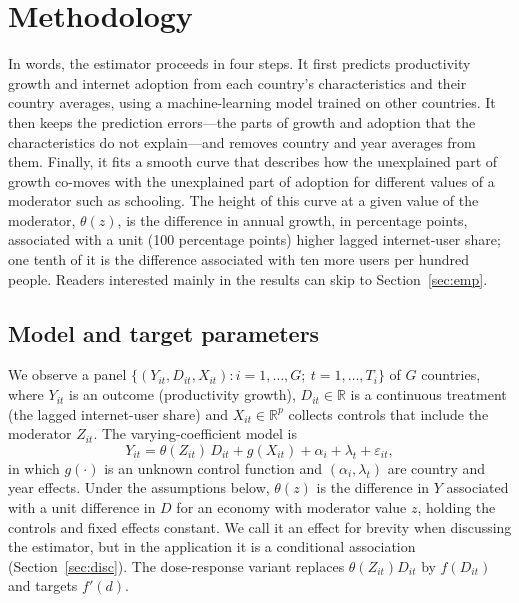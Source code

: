 \documentclass[pdflatex,sn-basic]{sn-jnl}%
\theoremstyle{thmstyleone}
\theoremstyle{thmstyletwo}
\begin{document}
\section{Methodology}\label{sec:method}

In words, the estimator proceeds in four steps. It first predicts productivity growth and internet adoption from each country's characteristics and their country averages, using a machine-learning model trained on other countries. It then keeps the prediction errors---the parts of growth and adoption that the characteristics do not explain---and removes country and year averages from them. Finally, it fits a smooth curve that describes how the unexplained part of growth co-moves with the unexplained part of adoption for different values of a moderator such as schooling. The height of this curve at a given value of the moderator, $\theta(z)$, is the difference in annual growth, in percentage points, associated with a unit (100 percentage points) higher lagged internet-user share; one tenth of it is the difference associated with ten more users per hundred people. Readers interested mainly in the results can skip to Section~\ref{sec:emp}.

\subsection{Model and target parameters}

We observe a panel $\{(Y_{it},D_{it},X_{it}) : i=1,\dots,G;\ t=1,\dots,T_i\}$ of $G$ countries, where $Y_{it}$ is an outcome (productivity growth), $D_{it}\in\mathbb{R}$ is a continuous treatment (the lagged internet-user share) and $X_{it}\in\mathbb{R}^p$ collects controls that include the moderator $Z_{it}$. The varying-coefficient model is
\begin{equation}
Y_{it} = \theta(Z_{it})\,D_{it} + g(X_{it}) + \alpha_i + \lambda_t + \varepsilon_{it},
\label{eq:model}
\end{equation}
in which $g(\cdot)$ is an unknown control function and $(\alpha_i,\lambda_t)$ are country and year effects. Under the assumptions below, $\theta(z)$ is the difference in $Y$ associated with a unit difference in $D$ for an economy with moderator value $z$, holding the controls and fixed effects constant. We call it an effect for brevity when discussing the estimator, but in the application it is a conditional association (Section~\ref{sec:disc}). The dose-response variant replaces $\theta(Z_{it})D_{it}$ by $f(D_{it})$ and targets $f'(d)$.
\end{document}
